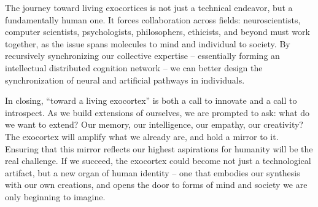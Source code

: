 \documentclass[11pt]{article}
\newcommand{\quotes}[1]{``#1''}
\begin{document}
The journey toward living exocortices is not just a technical endeavor, but a fundamentally human one. It forces collaboration across fields: neuroscientists, computer scientists, psychologists, philosophers, ethicists, and beyond must work together, as the issue spans molecules to mind and individual to society. By recursively synchronizing our collective expertise -- essentially forming an intellectual distributed cognition network -- we can better design the synchronization of neural and artificial pathways in individuals.

In closing, \quotes{toward a living exocortex} is both a call to innovate and a call to introspect. As we build extensions of ourselves, we are prompted to ask: what do we want to extend? Our memory, our intelligence, our empathy, our creativity? The exocortex will amplify what we already are, and hold a mirror to it. Ensuring that this mirror reflects our highest aspirations for humanity will be the real challenge. If we succeed, the exocortex could become not just a technological artifact, but a new organ of human identity -- one that embodies our synthesis with our own creations, and opens the door to forms of mind and society we are only beginning to imagine.
\end{document}
